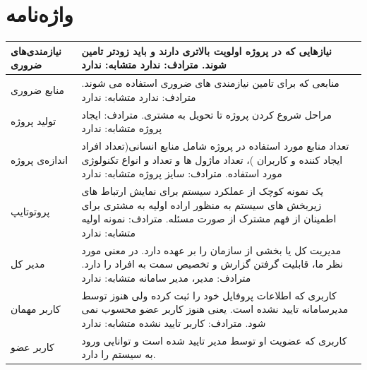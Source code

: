 \documentclass{article}
\begin{document}
\newpage
\section{واژه‌نامه}

\begin{tabular}{|p{2cm}|p{10cm}|}

\hline
نیازمندی‌های ضروری
&
نیازهایی که در پروژه اولویت بالاتری دارند و باید زودتر تامین شوند.
\newline
			 مترادف: ندارد
			 \newline
				متشابه: ندارد
\\
\hline
منابع ضروری
&
منابعی که برای تامین نیازمندی های ضروری استفاده می شوند.
\newline
				مترادف: ندارد
				\newline
				متشابه: ندارد
\\
\hline
تولید پروژه 
&
	مراحل شروع کردن پروژه تا تحویل به مشتری.
\newline
				مترادف: ایجاد پروژه
				\newline
				متشابه: ندارد
\\
\hline
اندازه‌ی پروژه 
&
تعداد منابع مورد استفاده در پروژه شامل منابع انسانی(تعداد افراد ایجاد کننده و
کاربران )، تعداد ماژول ها و تعداد و انواع تکنولوژی مورد استفاده.
\newline
				مترادف: سایز پروژه
				\newline
				متشابه: ندارد
\\
\hline
پروتوتایپ	
&
یک نمونه کوچک از عملکرد سیستم برای نمایش ارتباط های زیربخش های سیستم به 
منظور اراده اولیه به مشتری برای اطمینان از فهم مشترک از صورت مسئله.
\newline
				مترادف: نمونه اولیه
				\newline
				متشابه: ندارد
\\
\hline
مدیر کل
&
        مدیریت کل یا بخشی از سازمان را بر عهده دارد. در معنی مورد نظر ما، قابلیت گرفتن 
گزارش و تخصیص سمت به افراد را دارد.
\newline
				مترادف: مدیر، مدیر سامانه
				\newline
				متشابه: ندارد
\\
\hline
کاربر مهمان
&
 کاربری که اطلاعات پروفایل خود را ثبت کرده ولی هنوز توسط مدیرسامانه تایید نشده
				است. یعنی هنوز کاربر عضو محسوب نمی شود.
				\newline
				مترادف: کاربر تایید نشده
				\newline
				متشابه: ندارد
\\
\hline
کاربر عضو
&
کاربری که عضویت او توسط مدیر تایید شده است و توانایی ورود به سیستم را دارد.

\end{tabular}
\end{document}

